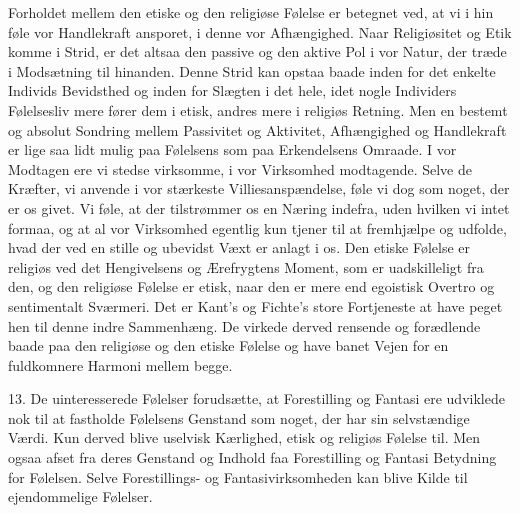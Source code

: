\documentclass[12pt,a4paper,openany]{book}
\newcommand{\opage}[1]{\marginnote{\footnotesize\textit{[#1]}}}
\begin{document}
Forholdet mellem den etiske og den religiøse Følelse er betegnet ved, at
vi i hin føle vor Handlekraft ansporet, i denne vor Afhængighed. Naar
Religiøsitet og Etik komme i Strid, er det altsaa den passive og den
aktive Pol i vor Natur, der træde i Modsætning til hinanden. Denne Strid
kan opstaa baade inden for det enkelte Individs Bevidsthed og inden for
Slægten i det hele, idet nogle Individers Følelsesliv mere fører dem i
etisk, andres mere i religiøs Retning. Men en bestemt og absolut
Sondring mellem Passivitet og Aktivitet, Afhængighed og Handlekraft er
lige saa lidt mulig paa Følelsens som paa Erkendelsens Omraade. I vor
Modtagen ere vi stedse virksomme, i vor Virksomhed modtagende. Selve de
Kræfter, vi anvende i vor stærkeste Villiesanspændelse, føle vi dog som
noget, der er os givet. Vi føle, at der tilstrømmer os en Næring
indefra, uden hvilken vi intet formaa, og at al vor Virksomhed egentlig
kun tjener til at fremhjælpe og udfolde,
\opage{314}hvad der ved en stille og ubevidst Væxt er anlagt i os. Den
etiske Følelse er religiøs ved det Hengivelsens og Ærefrygtens Moment,
som er uadskilleligt fra den, og den religiøse Følelse er etisk, naar
den er mere end egoistisk Overtro og sentimentalt Sværmeri. Det er
Kant’s og Fichte’s store Fortjeneste at have peget hen til denne indre
Sammenhæng. De virkede derved rensende og forædlende baade paa den
religiøse og den etiske Følelse og have banet Vejen for en fuldkomnere
Harmoni mellem begge.

13. De uinteresserede Følelser forudsætte, at Forestilling og Fantasi
ere udviklede nok til at fastholde Følelsens Genstand som noget, der har
sin selvstændige Værdi. Kun derved blive uselvisk Kærlighed, etisk og
religiøs Følelse til. Men ogsaa afset fra deres Genstand og Indhold faa
Forestilling og Fantasi Betydning for Følelsen. Selve Forestillings- og
Fantasivirksomheden kan blive Kilde til ejendommelige Følelser.
\end{document}
